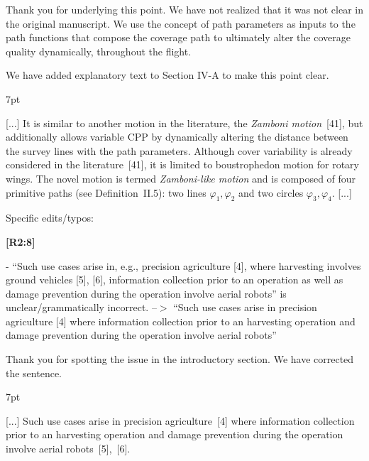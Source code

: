 \documentclass[10pt]{letter}
\newenvironment{formal}{%
  \def\FrameCommand{%
    \hspace{1pt}%
    {\color{red}\vrule width 2pt}%
    {\color{formalshade}\vrule width 4pt}%
    \colorbox{formalshade}%
  }%
  \MakeFramed{\advance\hsize-\width\FrameRestore}%
  \noindent\hspace{-4.55pt}%
  \begin{adjustwidth}{}{7pt}%
  \vspace{2pt}\vspace{2pt}%
}
{%
  \vspace{2pt}\end{adjustwidth}\endMakeFramed%
}
\begin{document}
{\color{blue} 
  
{\hspace*{-4.5em}{[R2:7]}\vspace*{-1.9em}}
  
Thank you for underlying this point. We have not realized that it was not clear in the original manuscript. We use the concept of path parameters as inputs to the path functions that compose the coverage path to ultimately alter the coverage quality dynamically, throughout the flight.

We have added explanatory text to Section IV-A to make this point clear.

\begin{formal}
  \color{black}
  [...] It is similar to another motion in the literature, the \emph{Zamboni motion}~[{\color{green}41}], but additionally allows variable CPP %
  {\color{blue} by dynamically altering the distance between the survey lines with the path parameters}. 
  {\color{blue} Although cover variability is already considered in the literature~[{\color{green}41}], it is limited to boustrophedon motion for rotary wings.}
  The novel motion is termed \emph{Zamboni-like motion} and is composed of four primitive paths (see Definition~{\color{red}II.5}): two lines $\varphi_1,\varphi_2$ and two circles $\varphi_3,\varphi_4$. [...]%
  \vspace*{1ex}
\end{formal}
}


\vspace{2em}

Specific edits/typos: 

{\hspace*{-4.5em}\textbf{[R2:8]}\vspace*{-1.9em}}

- ``Such use cases arise in, e.g., precision agriculture [4], where harvesting involves ground vehicles [5], [6], information collection prior to an operation as well as damage prevention during the operation involve aerial robots'' is unclear/grammatically incorrect. --$>$	``Such use cases arise in precision agriculture [4] where information collection prior to an harvesting operation and damage prevention during the operation involve aerial robots''
  
{\color{blue}

{\hspace*{-4.5em}{[R2:8]}\vspace*{-1.9em}}

Thank you for spotting the issue in the introductory section. We have corrected the sentence.

\begin{formal}
  \color{black} [...] Such use cases arise in precision agriculture~[{\color{green}4}] where {\color{blue}information collection prior to an harvesting operation and} damage prevention during the operation involve aerial robots~[{\color{green}5}],~[{\color{green}6}].

  \vspace*{1ex}
\end{formal}

}
\end{document}
